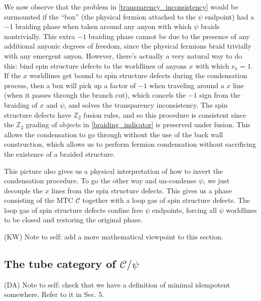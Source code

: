 \documentclass[12pt,a4paper]{article}
\newcommand{\mcc}{\mathcal{C}}
\newcommand{\zt}{\mathbb{Z}_2}
\newcommand{\kw}[1]{{\color{kwcolor}\footnotesize{(KW) #1}}}
\newcommand{\dave}[1]{{\color{ao(english)}\footnotesize{(DA) #1}}}
\begin{document}
We now observe that the problem in \eqref{transparency_inconsistency} would be 
surmounted if the ``box'' (the physical fermion attached to the $\psi$ endpoint) had a $-1$ 
braiding phase when taken around any anyon with which $\psi$ braids nontrivially. 
This extra $-1$ braiding phase cannot be due to the presence of any additional anyonic 
degrees of freedom, since the physical fermions braid trivially with any emergent anyon. 
However, there's actually a very natural way to do this: bind spin structure defects to the 
worldlines of anyons $x$ with which $\nu_x=1$. 
If the $x$ worldlines get bound to spin structure defects during the condensation 
process, then a box will pick up a factor of $-1$ when traveling around a $x$ line 
(when it passes through the branch cut), which cancels the $-1$ sign from the braiding of 
$x$ and $\psi$, and solves the transparency inconsistency. 
The spin structure defects have $\zt$ fusion rules, and so this procedure is consistent since 
the $\zt$ grading of objects in \eqref{braiding_indicator} is preserved under fusion. 
This allows the condensation to go through without the use of the back wall construction, 
which allows us to perform fermion condensation without sacrificing the existence of a 
braided structure. 

This picture also gives us a physical interpretation of how to invert the condensation 
procedure. 
To go the other way and un-condense $\psi$, we just decouple the $x$ lines from the spin structure defects.
This gives us a phase consisting of the MTC $\mcc$ together with a loop gas of spin structure defects.
The loop gas of spin structure defects confine free $\psi$ endpoints, forcing all $\psi$ 
worldlines to be closed and restoring the original phase. 

\kw{Note to self: add a more mathematical viewpoint to this section.}


\subsection{The tube category of $\mcc/\psi$}

\dave{Note to self: check that we have a definition of minimal idempotent somewhere.
Refer to it in Sec. 5.}
\end{document}
